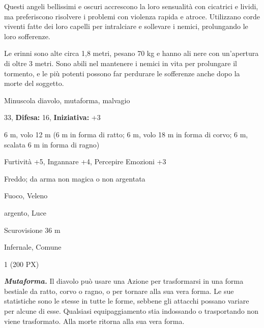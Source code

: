 \begin{multicols}{2}
{Questi angeli bellissimi e oscuri accrescono la loro sensualità con cicatrici e lividi, ma preferiscono risolvere i problemi con violenza rapida e atroce. Utilizzano corde viventi fatte dei loro capelli per intralciare e sollevare i nemici, prolungando le loro sofferenze.

Le erinni sono alte circa 1,8 metri, pesano 70 kg e hanno ali nere con un'apertura di oltre 3 metri. Sono abili nel mantenere i nemici in vita per prolungare il tormento, e le più potenti possono far perdurare le sofferenze anche dopo la morte del soggetto.

\noindent
\begin{description}[noitemsep, topsep=0pt, parsep=0pt, partopsep=0pt, leftmargin=0cm, labelwidth=2.2cm]
	\item[\textbf{Taglia/Tipo:}] Minuscola diavolo, mutaforma, malvagio
	\item[\textbf{Caratt.:}] 
	\item[\textbf{Punti Ferita:}] 33,  \textbf{Difesa:} 16,  \textbf{Iniziativa:} +3
	\item[\textbf{Movimento:}] 6 m, volo 12 m (6 m in forma di ratto; 6 m, volo 18 m in forma di corvo; 6 m, scalata 6 m in forma di ragno)
	\item[\textbf{Tiri Salvez.:}] 
	\item[\textbf{Comp.:}] Furtività +5, Ingannare +4, Percepire Emozioni +3
	\item[\textbf{Res. Danni:}] Freddo; da arma non magica o non argentata
	\item[\textbf{Imm. Danni:}] Fuoco, Veleno
	\item[\textbf{Vulnerabilità:}] argento, Luce
	\item[\textbf{Sensi:}] Scurovisione 36 m
	\item[\textbf{Linguaggi:}] Infernale, Comune
	\item[\textbf{Sfida:}] 1 (200 PX)\smallskip
\end{description}

\emph{\textbf{Mutaforma.}} Il diavolo può usare una Azione per trasformarsi in una forma bestiale da ratto, corvo o ragno, o per tornare alla sua vera forma. Le sue statistiche sono le stesse in tutte le forme, sebbene gli attacchi possano variare per alcune di esse. Qualsiasi equipaggiamento stia indossando o trasportando non viene trasformato. Alla morte ritorna alla sua vera forma.

}
\end{multicols}
